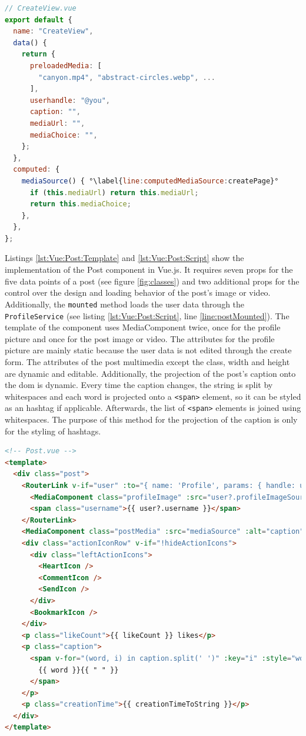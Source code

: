 \documentclass[a4paper, 10pt]{article}
\begin{document}
\begin{lstlisting}[caption=Create Page in Vue.js (Script), label={lst:Vue:Create:Script}, language=JavaScript, firstnumber=25, escapechar=°]
// CreateView.vue
export default {
  name: "CreateView",
  data() {
    return {
      preloadedMedia: [
        "canyon.mp4", "abstract-circles.webp", ...
      ],
      userhandle: "@you",
      caption: "",
      mediaUrl: "",
      mediaChoice: "",
    };
  },
  computed: {
    mediaSource() { °\label{line:computedMediaSource:createPage}°
      if (this.mediaUrl) return this.mediaUrl;
      return this.mediaChoice;
    },
  },
};
\end{lstlisting}
 
Listings \ref{lst:Vue:Post:Template} and \ref{lst:Vue:Post:Script} show the implementation of the Post component in Vue.js.
It requires seven props for the five data points of a post (see figure \ref{fig:classes}) and two additional props for the control over the design and loading behavior of the post's image or video.
Additionally, the \verb|mounted| method loads the user data through the \verb|ProfileService| (see listing \ref{lst:Vue:Post:Script}, line \ref{line:postMounted}).
The template of the component uses MediaComponent twice, once for the profile picture and once for the post image or video.
The attributes for the profile picture are mainly static because the user data is not edited through the create form.
The attributes of the post multimedia except the class, width and height are dynamic and editable.
Additionally, the projection of the post's caption onto the \acrshort{dom} is dynamic.
Every time the caption changes, the string is split by whitespaces and each word is projected onto a \verb|<span>| element, so it can be styled as an hashtag if applicable.
Afterwards, the list of \verb|<span>| elements is joined using whitespaces.
The purpose of this method for the projection of the caption is only for the styling of hashtags.

\begin{lstlisting}[caption=Post in Vue.js (Template), label={lst:Vue:Post:Template}, language=HTML]
<!-- Post.vue -->
<template>
  <div class="post">
    <RouterLink v-if="user" :to="{ name: 'Profile', params: { handle: userhandle } }" class="postUserInfo" >
      <MediaComponent class="profileImage" :src="user?.profileImageSource" alt="" width="44" height="44" />
      <span class="username">{{ user?.username }}</span>
    </RouterLink>
    <MediaComponent class="postMedia" :src="mediaSource" :alt="caption" width="100%" height="100%" :eagerLoading="eagerLoading" />
    <div class="actionIconRow" v-if="!hideActionIcons">
      <div class="leftActionIcons">
        <HeartIcon />
        <CommentIcon />
        <SendIcon />
      </div>
      <BookmarkIcon />
    </div>
    <p class="likeCount">{{ likeCount }} likes</p>
    <p class="caption">
      <span v-for="(word, i) in caption.split(' ')" :key="i" :style="word.startsWith('#') ? 'color: #0091E2' : ''">
        {{ word }}{{ " " }}
      </span>
    </p>
    <p class="creationTime">{{ creationTimeToString }}</p>
  </div>
</template>
\end{lstlisting}
  
\end{document}
